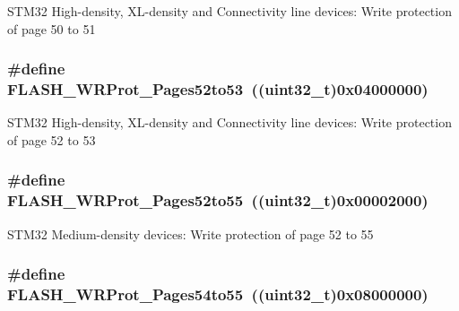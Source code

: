 \label{group__Option__Bytes__Write__Protection_ga053321e47944270a5fdcf0d58e16ec13}
STM32 High-\/density, XL-\/density and Connectivity line devices: Write protection of page 50 to 51 \hypertarget{group__Option__Bytes__Write__Protection_gae4eefefb23e8913e4aa558a6a2599fa5}{
\subsubsection[{FLASH\_\-WRProt\_\-Pages52to53}]{\setlength{\rightskip}{0pt plus 5cm}\#define FLASH\_\-WRProt\_\-Pages52to53~((uint32\_\-t)0x04000000)}}
\label{group__Option__Bytes__Write__Protection_gae4eefefb23e8913e4aa558a6a2599fa5}
STM32 High-\/density, XL-\/density and Connectivity line devices: Write protection of page 52 to 53 \hypertarget{group__Option__Bytes__Write__Protection_gab5beefbfebf060f71421995f3c7a6418}{
\subsubsection[{FLASH\_\-WRProt\_\-Pages52to55}]{\setlength{\rightskip}{0pt plus 5cm}\#define FLASH\_\-WRProt\_\-Pages52to55~((uint32\_\-t)0x00002000)}}
\label{group__Option__Bytes__Write__Protection_gab5beefbfebf060f71421995f3c7a6418}
STM32 Medium-\/density devices: Write protection of page 52 to 55 \hypertarget{group__Option__Bytes__Write__Protection_gacd4ea5e6cc3819f40a55a61f3075b626}{
\subsubsection[{FLASH\_\-WRProt\_\-Pages54to55}]{\setlength{\rightskip}{0pt plus 5cm}\#define FLASH\_\-WRProt\_\-Pages54to55~((uint32\_\-t)0x08000000)}}
